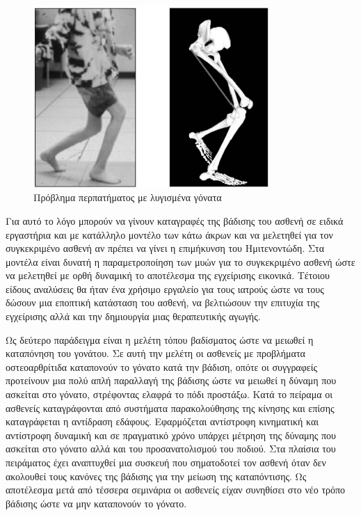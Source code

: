 \begin{figure}[H]
    \centering
    \includegraphics[width=0.8\textwidth]{introduction/fig/crouch-gait.png}
    \caption{Πρόβλημα περπατήματος με λυγισμένα γόνατα\cite{arnolda06}}
    \label{fig:crouch-gait}
\end{figure}

Για αυτό το λόγο μπορούν να γίνουν καταγραφές της βάδισης του ασθενή σε ειδικά εργαστήρια και με κατάλληλο μοντέλο των κάτω άκρων και να μελετηθεί για τον συγκεκριμένο ασθενή αν πρέπει να γίνει η επιμήκυνση του Ημιτενοντώδη. Στα μοντέλα είναι δυνατή η παραμετροποίηση των μυών για το συγκεκριμένο ασθενή ώστε να μελετηθεί με ορθή δυναμική το αποτέλεσμα της εγχείρισης εικονικά. Τέτοιου είδους αναλύσεις θα ήταν ένα χρήσιμο εργαλείο για τους ιατρούς ώστε να τους δώσουν μια εποπτική κατάσταση του ασθενή, να βελτιώσουν την επιτυχία της εγχείρισης αλλά και την δημιουργία μιας θεραπευτικής αγωγής.

Ως δεύτερο παράδειγμα \cite{fregly07} είναι η μελέτη τόπου βαδίσματος ώστε να μειωθεί η καταπόνηση του γονάτου. Σε αυτή την μελέτη οι ασθενείς με προβλήματα οστεοαρθρίτιδα καταπονούν το γόνατο κατά την βάδιση, οπότε οι συγγραφείς προτείνουν μια πολύ απλή παραλλαγή της βάδισης ώστε να μειωθεί η δύναμη που ασκείται στο γόνατο, στρέφοντας ελαφρά το πόδι προστάξω. Κατά το πείραμα οι ασθενείς καταγράφονται από συστήματα παρακολούθησης της κίνησης και επίσης καταγράφεται η αντίδραση εδάφους. Εφαρμόζεται αντίστροφη κινηματική και αντίστροφη δυναμική και σε πραγματικό χρόνο υπάρχει μέτρηση της δύναμης που ασκείται στο γόνατο αλλά και του προσανατολισμού του ποδιού. Στα πλαίσια του πειράματος έχει αναπτυχθεί μια συσκευή που σηματοδοτεί τον ασθενή όταν δεν ακολουθεί τους κανόνες της βάδισης για την μείωση της καταπόντισης. Ως αποτέλεσμα μετά από τέσσερα σεμινάρια οι ασθενείς είχαν συνηθίσει στο νέο τρόπο βάδισης ώστε να μην καταπονούν το γόνατο.

